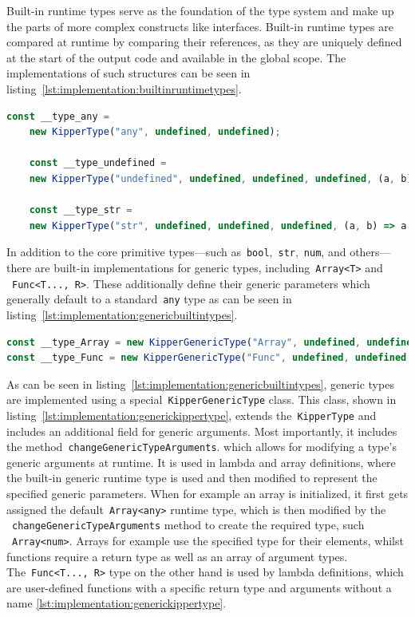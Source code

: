 Built-in runtime types serve as the foundation of the type system and make up the parts of more complex constructs like interfaces. Built-in runtime types are compared at runtime by comparing their references, as they are uniquely defined at the start of the output code and available in the global scope. The implementations of such structures can be seen in listing~\ref{lst:implementation:builtinruntimetypes}.

\begin{lstlisting}[language=TypeScript,caption=Examples for the built-in runtime types,label=lst:implementation:builtinruntimetypes]
	const __type_any =
	new KipperType("any", undefined, undefined);

	const __type_undefined =
	new KipperType("undefined", undefined, undefined, undefined, (a, b) => a.name === b.name);

	const __type_str =
	new KipperType("str", undefined, undefined, undefined, (a, b) => a.name === b.name);
\end{lstlisting}

In addition to the core primitive types—such as~\lstinline|bool|,~\lstinline|str|,~\lstinline|num|, and others—there are built-in implementations for generic types, including~\lstinline|Array<T>| and ~\lstinline|Func<T..., R>|. These additionally define their generic parameters which generally default to a standard~\lstinline|any| type as can be seen in listing~\ref{lst:implementation:genericbuiltintypes}.

\begin{lstlisting}[language=Typescript,caption=Generic built-in types,label=lst:implementation:genericbuiltintypes]
const __type_Array = new KipperGenericType("Array", undefined, undefined, {T: __type_any});
const __type_Func = new KipperGenericType("Func", undefined, undefined, {T: [], R: __type_any});
\end{lstlisting}

As can be seen in listing~\ref{lst:implementation:genericbuiltintypes}, generic types are implemented using a special~\lstinline|KipperGenericType| class. This class, shown in listing~\ref{lst:implementation:generickippertype}, extends the~\lstinline|KipperType| and includes an additional field for generic arguments. Most importantly, it includes the method~\lstinline|changeGenericTypeArguments|. which allows for modifying a type's generic arguments at runtime. It is used in lambda and array definitions, where the built-in generic runtime type is used and then modified to represent the specified generic parameters. When for example an array is initialized, it first gets assigned the default~\lstinline|Array<any>| runtime type, which is then modified by the ~\lstinline|changeGenericTypeArguments| method to create the required type, such ~\lstinline|Array<num>|. Arrays for example use the specified type for their elements, whilst functions require a return type as well as an array of argument types. The~\lstinline|Func<T..., R>| type on the other hand is used by lambda definitions, which are user-defined functions with a specific return type and arguments without a name \ref{lst:implementation:generickippertype}.

